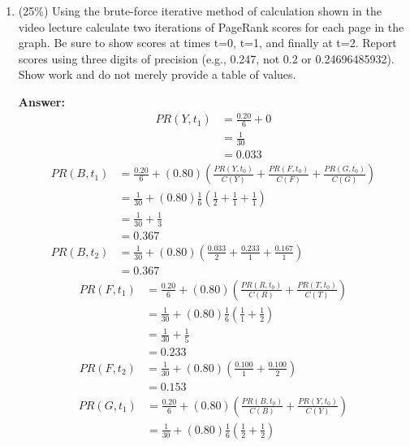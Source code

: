 \documentclass[11pt]{article}
\begin{document}
\begin{enumerate}
\begin{enumerate}
            \item (25\%) Using the brute-force iterative method of calculation shown in the video lecture calculate two iterations of PageRank scores for each page in the graph. Be sure to show scores at times t=0, t=1, and finally at t=2. Report scores using three digits of precision (e.g., 0.247, not 0.2 or 0.24696485932). Show work and do not merely provide a table of values.

            \textbf{Answer:}
            \begin{align*}
                PR(Y,t_{1}) &= \frac{0.20}{6}+0 \\
                &= \frac{1}{30} \\
                &= 0.033
            \end{align*}
            \begin{align*}
                PR(B,t_{1}) &= \frac{0.20}{6}+(0.80)\left(\frac{PR(Y,t_{0})}{C(Y)}+\frac{PR(F,t_{0})}{C(F)}+\frac{PR(G,t_{0})}{C(G)}\right) \\
                &= \frac{1}{30}+(0.80)\frac{1}{6}\left(\frac{1}{2}+\frac{1}{1}+\frac{1}{1}\right) \\
                &= \frac{1}{30}+\frac{1}{3} \\
                &= 0.367 \\
                PR(B,t_{2}) &= \frac{1}{30}+(0.80)\left(\frac{0.033}{2}+\frac{0.233}{1}+\frac{0.167}{1}\right) \\
                &= 0.367
            \end{align*}
            \begin{align*}
                PR(F,t_{1}) &= \frac{0.20}{6}+(0.80)\left(\frac{PR(R,t_{0})}{C(R)}+\frac{PR(T,t_{0})}{C(T)}\right) \\
                &= \frac{1}{30}+(0.80)\frac{1}{6}\left(\frac{1}{1}+\frac{1}{2}\right) \\
                &= \frac{1}{30}+\frac{1}{5} \\
                &= 0.233 \\
                PR(F,t_{2}) &= \frac{1}{30}+(0.80)\left(\frac{0.100}{1}+\frac{0.100}{2}\right) \\
                &= 0.153
            \end{align*}
            \begin{align*}
                PR(G,t_{1}) &= \frac{0.20}{6}+(0.80)\left(\frac{PR(B,t_{0})}{C(B)}+\frac{PR(Y,t_{0})}{C(Y)}\right) \\
                &= \frac{1}{30}+(0.80)\frac{1}{6}\left(\frac{1}{2}+\frac{1}{2}\right) \\

\end{align*}
\end{enumerate}
\end{enumerate}
\end{document}

